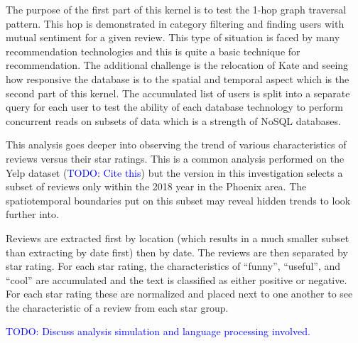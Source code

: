 The purpose of the first part of this kernel is to test the 1-hop graph traversal pattern. This hop is demonstrated in category filtering and finding users with mutual sentiment for a given review. This type of situation is faced by many recommendation technologies and this is quite a basic technique for recommendation. The additional challenge is the relocation of Kate and seeing how responsive the database is to the spatial and temporal aspect which is the second part of this kernel. The accumulated list of users is split into a separate query for each user to test the ability of each database technology to perform concurrent reads on subsets of data which is a strength of NoSQL databases.

This analysis goes deeper into observing the trend of various characteristics of reviews versus their star ratings. This is a common analysis performed on the Yelp dataset (\textcolor{blue}{TODO: Cite this}) but the version in this investigation selects a subset of reviews only within the 2018 year in the Phoenix area. The spatiotemporal boundaries put on this subset may reveal hidden trends to look further into.

Reviews are extracted first by location (which results in a much smaller subset than extracting by date first) then by date. The reviews are then separated by star rating. For each star rating, the characteristics of ``funny'', ``useful'', and ``cool'' are accumulated and the text is classified as either positive or negative. For each star rating these are normalized and placed next to one another to see the characteristic of a review from each star group.

\subsubsubsection{\textcolor{blue}{ TODO: Come up with a third kernel.}}
\textcolor{blue}{ TODO: Discuss analysis simulation and language processing involved.}
